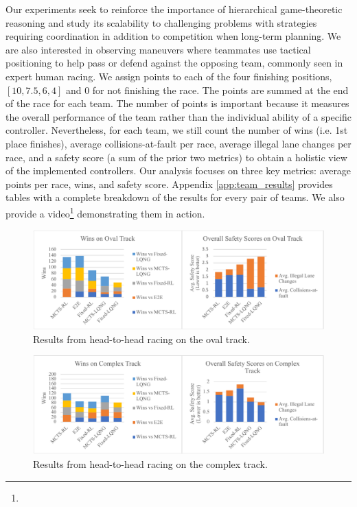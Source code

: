 Our experiments seek to reinforce the importance of hierarchical game-theoretic reasoning and study its scalability to challenging problems with strategies requiring coordination in addition to competition when long-term planning. We are also interested in observing maneuvers where teammates use tactical positioning to help pass or defend against the opposing team, commonly seen in expert human racing. We assign points to each of the four finishing positions, $[10, 7.5, 6, 4]$ and $0$ for not finishing the race. The points are summed at the end of the race for each team. The number of points is important because it measures the overall performance of the team rather than the individual ability of a specific controller. Nevertheless, for each team, we still count the number of wins (i.e. 1st place finishes), average collisions-at-fault per race, average illegal lane changes per race, and a safety score (a sum of the prior two metrics) to obtain a holistic view of the implemented controllers. Our analysis focuses on three key metrics: average points per race, wins, and safety score. Appendix \ref{app:team_results} provides tables with a complete breakdown of the results for every pair of teams. We also provide a video\footnote{\vidurlteam} demonstrating them in action. 

\begin{figure}
  \centering
\includegraphics[width=\textwidth]{Figures/TeamOvalResultsFinal.pdf}
  \caption{Results from head-to-head racing on the oval track.}
  \label{fig:team_results_oval}
\end{figure}
\begin{figure}
\centering
  \includegraphics[width=\textwidth]{Figures/TeamComplexResultsFinal.pdf}
  \caption{Results from head-to-head racing on the complex track.}
  \label{fig:team_results_complex}
\end{figure}

